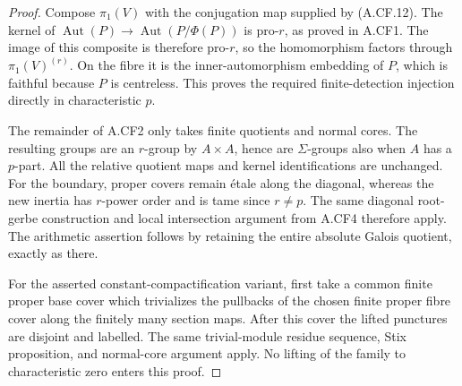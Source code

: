\begin{proof}
Compose \(\pi_1(V)\) with the conjugation map supplied by (A.CF.12).
The kernel of
\(\operatorname{Aut}(P)\to\operatorname{Aut}(P/\Phi(P))\)
is pro-\(r\), as proved in A.CF1. The image of this composite is
therefore pro-\(r\), so the homomorphism factors through
\(\pi_1(V)^{(r)}\). On the fibre it is the inner-automorphism
embedding of \(P\), which is faithful because \(P\) is centreless.
This proves the required finite-detection injection directly in
characteristic \(p\).

The remainder of A.CF2 only takes finite quotients and normal cores.
The resulting groups are an \(r\)-group by \(A\times A\), hence
are \(\Sigma\)-groups also when \(A\) has a \(p\)-part. All the
relative quotient maps and kernel identifications are unchanged.
For the boundary, proper covers remain étale along the diagonal,
whereas the new inertia has \(r\)-power order and is tame since
\(r\ne p\). The same diagonal root-gerbe construction and local
intersection argument from A.CF4 therefore apply. The arithmetic
assertion follows by retaining the entire absolute Galois quotient,
exactly as there.

For the asserted constant-compactification variant, first take a
common finite proper base cover which trivializes the pullbacks of
the chosen finite proper fibre cover along the finitely many section
maps. After this cover the lifted punctures are disjoint and labelled.
The same trivial-module residue sequence, Stix proposition, and
normal-core argument apply. No lifting of the family to characteristic
zero enters this proof.
\end{proof}
